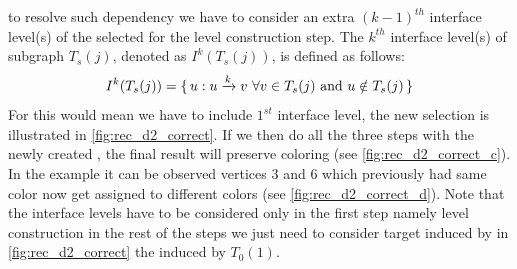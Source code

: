    \Inorder to resolve such dependency we have to consider an extra $(k-1)^{th}$ interface level(s) of the selected \subgraph for the level construction step. The $k^{th}$ interface level(s) of subgraph $T_s(j)$, denoted as $I^k(T_s(j))$, is defined as follows:
   \begin{equation*}
	   I^k(T_s(j)) = \set{u : u \xrightarrow{k} v \text{  } \forall v \in T_s(j) \text { and } u \notin T_s(j)}
   \end{equation*}
   For \DTWO this would mean we have to include $1^{st}$ interface level, the new selection is illustrated in \cref{fig:rec_d2_correct}. If we then do all the three steps with the newly created \subgraph, the final result will preserve \DTWO coloring (see \cref{fig:rec_d2_correct_c}). In the example it can be observed vertices $3$ and $6$ which previously had same color now get assigned to different colors (see \cref{fig:rec_d2_correct_d}). Note that the interface levels have to be considered only in the first step namely level construction in the rest of the steps we just need to consider target \subgraphs induced by \levelGroups \ie in \cref{fig:rec_d2_correct} the \subgraph induced by $T_0(1)$. 
   
